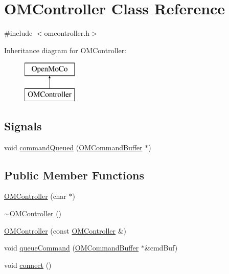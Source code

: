 \hypertarget{class_o_m_controller}{
\section{OMController Class Reference}
\label{class_o_m_controller}
}


{\ttfamily \#include $<$omcontroller.h$>$}

Inheritance diagram for OMController:\begin{figure}[H]
\begin{center}
\leavevmode
\includegraphics[height=2.000000cm]{class_o_m_controller}
\end{center}
\end{figure}
\subsection*{Signals}
\begin{DoxyCompactItemize}
\item 
void \hyperlink{class_o_m_controller_a16a02fca40829bb599649af820b59dec}{commandQueued} (\hyperlink{class_o_m_command_buffer}{OMCommandBuffer} $\ast$)
\end{DoxyCompactItemize}
\subsection*{Public Member Functions}
\begin{DoxyCompactItemize}
\item 
\hyperlink{class_o_m_controller_a37eb41ecd6775bd52ed520de69791ee5}{OMController} (char $\ast$)
\item 
\hyperlink{class_o_m_controller_a47ede74e236098c8b6f99c3de09f83b2}{$\sim$OMController} ()
\item 
\hyperlink{class_o_m_controller_a3480c3c367380bcea66825aae681c5c2}{OMController} (const \hyperlink{class_o_m_controller}{OMController} \&)
\item 
void \hyperlink{class_o_m_controller_a6cd9727f3c24525d0fa2903f59c4f2d9}{queueCommand} (\hyperlink{class_o_m_command_buffer}{OMCommandBuffer} $\ast$\&cmdBuf)
\item 
void \hyperlink{class_o_m_controller_a1e175037d84423402c04f73bc913f735}{connect} ()
\end{DoxyCompactItemize}


